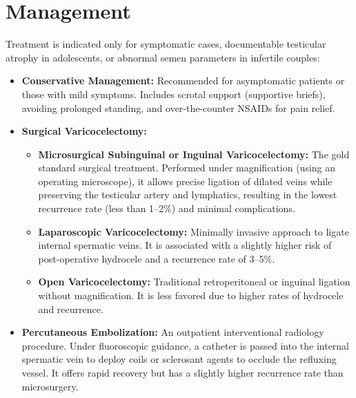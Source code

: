\section*{Management}
Treatment is indicated only for symptomatic cases, documentable testicular atrophy in adolescents, or abnormal semen parameters in infertile couples:
\begin{itemize}
  \item \textbf{Conservative Management:} Recommended for asymptomatic patients or those with mild symptoms. Includes scrotal support (supportive briefs), avoiding prolonged standing, and over-the-counter NSAIDs for pain relief.
  \item \textbf{Surgical Varicocelectomy:}
  \begin{itemize}
    \item \textbf{Microsurgical Subinguinal or Inguinal Varicocelectomy:} The gold standard surgical treatment. Performed under magnification (using an operating microscope), it allows precise ligation of dilated veins while preserving the testicular artery and lymphatics, resulting in the lowest recurrence rate (less than 1--2\%) and minimal complications.
    \item \textbf{Laparoscopic Varicocelectomy:} Minimally invasive approach to ligate internal spermatic veins. It is associated with a slightly higher risk of post-operative hydrocele and a recurrence rate of 3--5\%.
    \item \textbf{Open Varicocelectomy:} Traditional retroperitoneal or inguinal ligation without magnification. It is less favored due to higher rates of hydrocele and recurrence.
  \end{itemize}
  \item \textbf{Percutaneous Embolization:} An outpatient interventional radiology procedure. Under fluoroscopic guidance, a catheter is passed into the internal spermatic vein to deploy coils or sclerosant agents to occlude the refluxing vessel. It offers rapid recovery but has a slightly higher recurrence rate than microsurgery.
\end{itemize}

